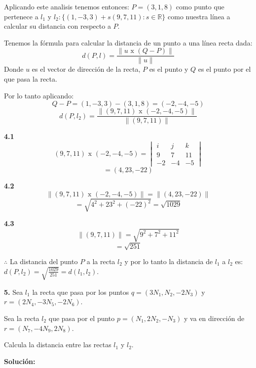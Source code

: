 \documentclass{article}
\begin{document}
Aplicando este analisis tenemos entonces: $P = (3, 1, 8)$ como punto que pertenece a $l_1$ y $l_2: \{(1,-3,3)+s(9,7,11): s \in \mathbb{R}\}$ como nuestra línea a calcular 
su distancia con respecto a $P$. 

Tenemos la fórmula para calcular la distancia de un punto a una línea recta dada: 
$$d (P, l) = \frac{\|u \text{ x } (Q-P)\|}{\|u\|}$$
Donde $u$ es el vector de dirección de la recta, $P$ es el punto y $Q$ es el punto por el que pasa la recta. 

Por lo tanto aplicando:
$$Q-P = (1,-3,3)-(3,1,8) =(-2, -4, -5)$$
$$d (P, l_2) = \frac{\|(9,7,11) \text{ x } (-2,-4,-5)\|}{\|(9,7,11)\|}$$

\begin{minipage}[c]{0.5cm}
    \textbf{4.1}
    $$(9,7,11) \text{ x } (-2,-4,-5) =\begin{vmatrix}
        i & j & k \\
        9 & 7 & 11 \\
        -2 & -4 & -5
    \end{vmatrix}$$
    $$=(4, 23, -22)$$
\end{minipage}\hspace*{7cm}\begin{minipage}[c]{0.5cm}
    \textbf{4.2}
    $$\|(9,7,11) \text{ x } (-2,-4,-5)\| = \|(4,23,-22)\|$$
    $$=\sqrt{4^2+23^2+(-22)^2} = \sqrt{1029}$$
\end{minipage}
\vspace*{20pt}

\begin{minipage}[c]{0.5cm}
    \textbf{4.3}
    $$\|(9,7,11)\| = \sqrt{9^2+7^2+11^2}$$
    $$=\sqrt{251}$$
\end{minipage}
\vspace*{20pt}

$\therefore$ La distancia del punto $P$ a la recta $l_2$ y por lo tanto la distancia de $l_1$ a $l_2$ es: $d(P,l_2)=\sqrt{\frac{1029}{251}}=d(l_1,l_2)$.
\vspace{10pt}

\textbf{5.} Sea $l_1$ la recta que pasa por los puntos $q = (3N_1, N_2, -2N_3)$ y $r = (2N_4, -3N_5, -2N_6)$.

Sea la recta $l_2$ que pasa por el punto $p = (N_1, 2N_2, -N_3)$ y va en dirección de $r =(N_7, -4N_9,2N_8)$.

Calcula la distancia entre las rectas $l_1$ y $l_2$.
\vspace{10pt}

\textbf{Solución:}
\vspace{10pt}
\end{document}
